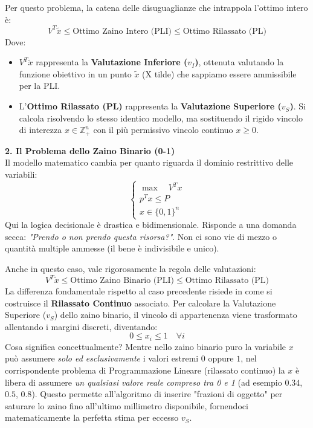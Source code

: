 \documentclass[12pt, a4paper]{article}
\begin{document}
	Per questo problema, la catena delle disuguaglianze che intrappola l'ottimo intero è:
	\[
	V^T \tilde{x} \leq \text{Ottimo Zaino Intero (PLI)} \leq \text{Ottimo Rilassato (PL)}
	\]
	Dove:
	\begin{itemize}[label=\textcolor{titlecolor}{\Large\textbullet}, itemsep=2pt, leftmargin=1.5cm]
		\item $V^T \tilde{x}$ rappresenta la \textbf{Valutazione Inferiore ($v_I$)}, ottenuta valutando la funzione obiettivo in un punto $\tilde{x}$ (X tilde) che sappiamo essere ammissibile per la PLI.
		\item L'\textbf{Ottimo Rilassato (PL)} rappresenta la \textbf{Valutazione Superiore ($v_S$)}. Si calcola risolvendo lo stesso identico modello, ma sostituendo il rigido vincolo di interezza $x \in \mathbb{Z}^n_+$ con il più permissivo vincolo continuo $x \geq 0$.
	\end{itemize}
	
	\vspace{0.4cm}
	\textbf{2. Il Problema dello Zaino Binario (0-1)}\\
	Il modello matematico cambia per quanto riguarda il dominio restrittivo delle variabili:
	\[
	\begin{cases}
		\max \quad V^T x \\
		p^T x \leq P \\
		x \in \{0, 1\}^n
	\end{cases}
	\]
	Qui la logica decisionale è drastica e bidimensionale. Risponde a una domanda secca: \textit{"Prendo o non prendo questa risorsa?"}. Non ci sono vie di mezzo o quantità multiple ammesse (il bene è indivisibile e unico).
	
	Anche in questo caso, vale rigorosamente la regola delle valutazioni:
	\[
	V^T \tilde{x} \leq \text{Ottimo Zaino Binario (PLI)} \leq \text{Ottimo Rilassato (PL)}
	\]
	La differenza fondamentale rispetto al caso precedente risiede in come si costruisce il \textbf{Rilassato Continuo} associato. Per calcolare la Valutazione Superiore ($v_S$) dello zaino binario, il vincolo di appartenenza viene trasformato allentando i margini discreti, diventando:
	\[
	0 \leq x_i \leq 1 \quad \forall i
	\]
	Cosa significa concettualmente? Mentre nello zaino binario puro la variabile $x$ può assumere \textit{solo ed esclusivamente} i valori estremi $0$ oppure $1$, nel corrispondente problema di Programmazione Lineare (rilassato continuo) la $x$ è libera di assumere \textit{un qualsiasi valore reale compreso tra 0 e 1} (ad esempio $0.34$, $0.5$, $0.8$). Questo permette all'algoritmo di inserire "frazioni di oggetto" per saturare lo zaino fino all'ultimo millimetro disponibile, fornendoci matematicamente la perfetta stima per eccesso $v_S$.
	
\end{document}
